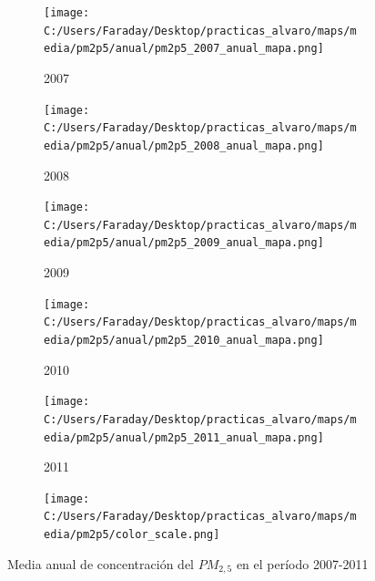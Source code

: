 \documentclass[12pt]{article}
\begin{document}
\begin{figure}[H]
\centering
\begin{subfigure}[H]{0.18\textwidth}
\texttt{[image: C:/Users/Faraday/Desktop/practicas\_alvaro/maps/media/pm2p5/anual/pm2p5\_2007\_anual\_mapa.png]}
\captionsetup{labelformat=empty}
\caption{2007}
\end{subfigure}
%
\begin{subfigure}[H]{0.18\textwidth}
\texttt{[image: C:/Users/Faraday/Desktop/practicas\_alvaro/maps/media/pm2p5/anual/pm2p5\_2008\_anual\_mapa.png]}
\captionsetup{labelformat=empty}
\caption{2008}
\end{subfigure}
%
\begin{subfigure}[H]{0.18\textwidth}
\texttt{[image: C:/Users/Faraday/Desktop/practicas\_alvaro/maps/media/pm2p5/anual/pm2p5\_2009\_anual\_mapa.png]}
\captionsetup{labelformat=empty}
\caption{2009}
\end{subfigure}
%
\begin{subfigure}[H]{0.18\textwidth}
\texttt{[image: C:/Users/Faraday/Desktop/practicas\_alvaro/maps/media/pm2p5/anual/pm2p5\_2010\_anual\_mapa.png]}
\captionsetup{labelformat=empty}
\caption{2010}
\end{subfigure}
%
\begin{subfigure}[H]{0.18\textwidth}
\texttt{[image: C:/Users/Faraday/Desktop/practicas\_alvaro/maps/media/pm2p5/anual/pm2p5\_2011\_anual\_mapa.png]}
\captionsetup{labelformat=empty}
\caption{2011}
\end{subfigure}

\begin{subfigure}[H]{0.45\textwidth}
\texttt{[image: C:/Users/Faraday/Desktop/practicas\_alvaro/maps/media/pm2p5/color\_scale.png]}
\captionsetup{labelformat=empty}
\caption{}
\end{subfigure}

\vspace*{-7mm}
\caption{Media anual de concentración del $PM_{2,5}$ en el período 2007-2011}
\label{fig:map-pm2p5-anual}
\end{figure}
\end{document}
